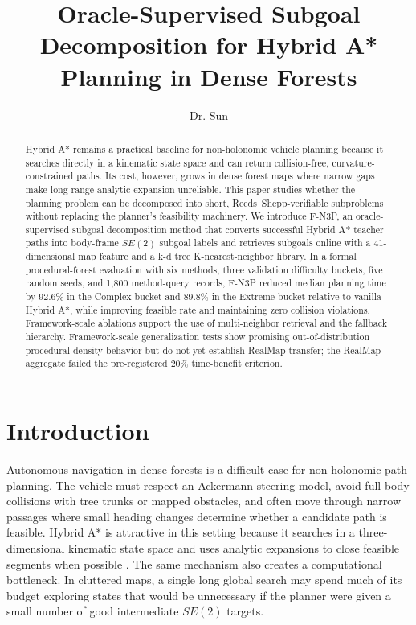 \documentclass[11pt,a4paper]{article}
\title{Oracle-Supervised Subgoal Decomposition for Hybrid A* Planning in Dense Forests}
\author{Dr. Sun}
\date{}
\begin{document}
\maketitle

\begin{abstract}
Hybrid A* remains a practical baseline for non-holonomic vehicle planning because it searches directly in a kinematic state space and can return collision-free, curvature-constrained paths. Its cost, however, grows in dense forest maps where narrow gaps make long-range analytic expansion unreliable. This paper studies whether the planning problem can be decomposed into short, Reeds--Shepp-verifiable subproblems without replacing the planner's feasibility machinery. We introduce F-N3P, an oracle-supervised subgoal decomposition method that converts successful Hybrid A* teacher paths into body-frame $SE(2)$ subgoal labels and retrieves subgoals online with a 41-dimensional map feature and a k-d tree K-nearest-neighbor library. In a formal procedural-forest evaluation with six methods, three validation difficulty buckets, five random seeds, and 1,800 method-query records, F-N3P reduced median planning time by 92.6\% in the Complex bucket and 89.8\% in the Extreme bucket relative to vanilla Hybrid A*, while improving feasible rate and maintaining zero collision violations. Framework-scale ablations support the use of multi-neighbor retrieval and the fallback hierarchy. Framework-scale generalization tests show promising out-of-distribution procedural-density behavior but do not yet establish RealMap transfer; the RealMap aggregate failed the pre-registered 20\% time-benefit criterion.
\end{abstract}

\section{Introduction}
\label{sec:introduction}
Autonomous navigation in dense forests is a difficult case for non-holonomic path planning. The vehicle must respect an Ackermann steering model, avoid full-body collisions with tree trunks or mapped obstacles, and often move through narrow passages where small heading changes determine whether a candidate path is feasible. Hybrid A* is attractive in this setting because it searches in a three-dimensional kinematic state space and uses analytic expansions to close feasible segments when possible \cite{Dolgov2010HybridAstar}. The same mechanism also creates a computational bottleneck. In cluttered maps, a single long global search may spend much of its budget exploring states that would be unnecessary if the planner were given a small number of good intermediate $SE(2)$ targets.
\end{document}
